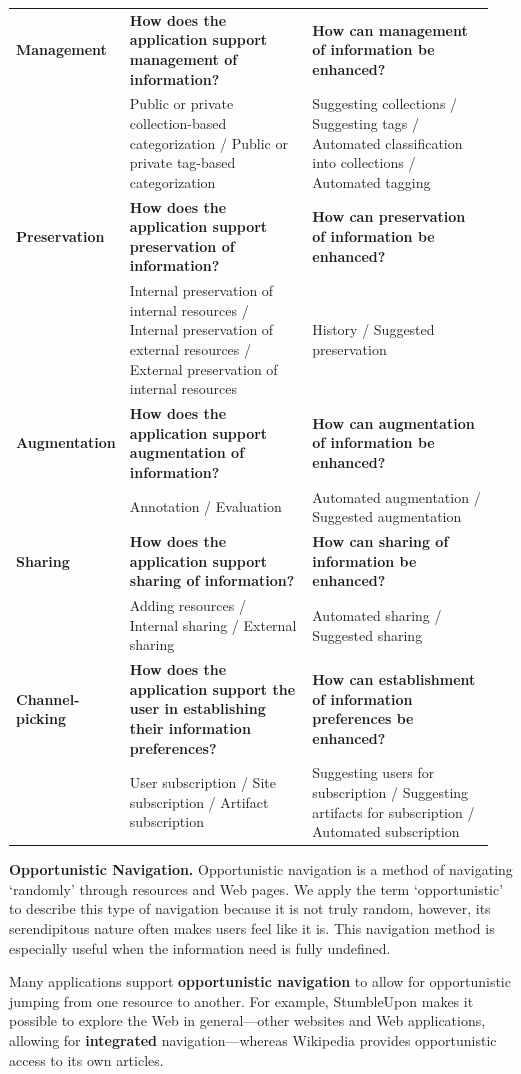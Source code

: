 \documentclass{sigchi}
\begin{document}
{\begin{table}[htbp]
\begin{tabular}{|p{0.15\linewidth}| p{0.40\linewidth}| p{0.40\linewidth}|}
\textbf{Management} & \textbf{How does the application support management of information?} & \textbf{How can management of information be enhanced?}\\
& Public or private collection-based categorization / Public or private tag-based categorization & Suggesting collections / Suggesting tags / Automated classification into collections / Automated tagging \\
\textbf{Preservation} & \textbf{How does the application support preservation of information?} & \textbf{How can preservation of information be enhanced?}\\
& Internal preservation of internal resources / Internal preservation of external resources / External preservation of internal resources & History / Suggested preservation  \\
\textbf{Augmentation} & \textbf{How does the application support augmentation of information?} & \textbf{How can augmentation of information be enhanced?}\\
& Annotation / Evaluation & Automated augmentation / Suggested augmentation \\ 
\textbf{Sharing} & \textbf{How does the application support sharing of information?} & \textbf{How can sharing of information be enhanced?}\\
& Adding resources / Internal sharing / External sharing & Automated sharing / Suggested sharing \\
\textbf{Channel-picking}  	& \textbf{How does the application support the user in establishing their information preferences?} & \textbf{How can establishment of information preferences be enhanced?}\\
& User subscription / Site subscription / Artifact subscription & Suggesting users for subscription / Suggesting artifacts for subscription / Automated subscription \\     
\hline
\end{tabular}
\end{table}

\textbf{Opportunistic Navigation.}
Opportunistic navigation is a method of navigating `randomly' through resources and Web pages. We apply the term `opportunistic' to describe this type of navigation because it is not truly random, however, its serendipitous nature often makes users feel like it is. This navigation method is especially useful when the information need is fully undefined.

Many applications support \textbf{opportunistic navigation} to allow for opportunistic jumping from one resource to another. For example, StumbleUpon makes it possible to explore the Web in general---other websites and Web applications, allowing for \textbf{integrated} navigation---whereas Wikipedia provides opportunistic access to its own articles. 


}
\end{document}
